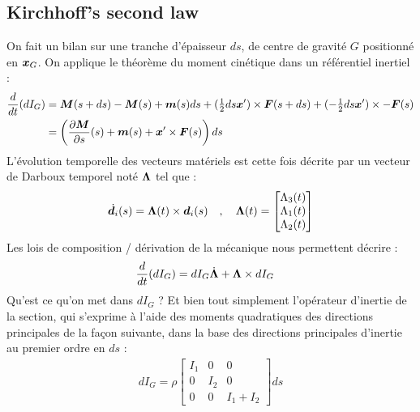\subsection{Kirchhoff's second law}
On fait un bilan sur une tranche d'épaisseur $ds$, de centre de gravité $G$ positionné en $\boldsymbol{x}_G$. On applique le théorème du moment cinétique dans un référentiel inertiel :
\begin{equation}
	\begin{aligned}
		\frac{d}{dt}(dI_G) &= 
		\boldsymbol{M}(s+ds)-\boldsymbol{M}(s) + \boldsymbol{m}(s)ds
		+ (\tfrac{1}{2}ds\boldsymbol{x}')\times \boldsymbol{F}(s+ds) + (-\tfrac{1}{2}ds\boldsymbol{x}')\times -\boldsymbol{F}(s)\\
		&= \left(\frac{\partial \boldsymbol{M}}{\partial s}(s)+\boldsymbol{m}(s) + \boldsymbol{x}'\times \boldsymbol{F}(s)\right)ds
	\end{aligned}
\end{equation}
L'évolution temporelle des vecteurs matériels est cette fois décrite par un vecteur de Darboux temporel noté $\boldsymbol{\Lambda}$ tel que :
\begin{equation}
	\dot{\boldsymbol{d}_{i}}(s) =\boldsymbol{\Lambda}(t) \times \boldsymbol{d}_i(s)	\quad,\quad
	\boldsymbol{\Lambda}(t)
	= 
	\begin{bmatrix}
		\Lambda_3(t) \\
		\Lambda_1(t) \\
		\Lambda_2(t)
	\end{bmatrix}
\end{equation}
Les lois de composition / dérivation de la mécanique nous permettent décrire :
\begin{equation}
	\begin{aligned}
		\frac{d}{dt}(dI_G) &= dI_G\dot{\boldsymbol{\Lambda}} + \boldsymbol{\Lambda}\times dI_G
	\end{aligned}
\end{equation}
Qu'est ce qu'on met dans $dI_G$ ? Et bien tout simplement l'opérateur d'inertie de la section, qui s'exprime à l'aide des moments quadratiques des directions principales de la façon suivante, dans la base des directions principales d'inertie au premier ordre en $ds$ :
\begin{equation}
	\begin{aligned}
		dI_G = \rho
			\begin{bmatrix}
				I_1 & 0 & 0 \\
				0 & I_2 & 0 \\
				0 & 0 & I_1+I_2
			\end{bmatrix} ds
	\end{aligned}
\end{equation}
